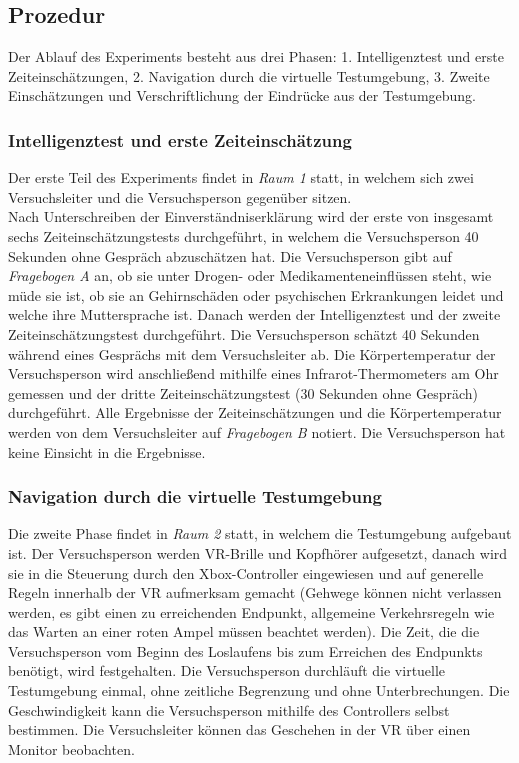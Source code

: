 \documentclass{Paper}
\begin{document}
\subsection{Prozedur}

Der Ablauf des Experiments besteht aus drei Phasen: 1. Intelligenztest und erste Zeiteinschätzungen, 2. Navigation durch die virtuelle Testumgebung, 3. Zweite Einschätzungen und Verschriftlichung der Eindrücke aus der Testumgebung.

\subsubsection{Intelligenztest und erste Zeiteinschätzung}
Der erste Teil des Experiments findet in \textit{Raum 1} statt, in welchem sich zwei Versuchsleiter und die Versuchsperson gegenüber sitzen.\\
Nach Unterschreiben der Einverständniserklärung wird der erste von insgesamt sechs Zeiteinschätzungstests durchgeführt, in welchem die Versuchsperson 40 Sekunden ohne Gespräch abzuschätzen hat. Die Versuchsperson gibt auf \textit{Fragebogen A} an, ob sie unter Drogen- oder Medikamenteneinflüssen steht, wie müde sie ist, ob sie an Gehirnschäden oder psychischen Erkrankungen leidet und welche ihre Muttersprache ist.
Danach werden der Intelligenztest und der zweite Zeiteinschätzungstest durchgeführt. Die Versuchsperson schätzt 40 Sekunden während eines Gesprächs mit dem Versuchsleiter ab. Die Körpertemperatur der Versuchsperson wird anschließend mithilfe eines Infrarot-Thermometers am Ohr gemessen und der dritte Zeiteinschätzungstest (30 Sekunden ohne Gespräch) durchgeführt.
Alle Ergebnisse der Zeiteinschätzungen und die
Körpertemperatur werden von dem Versuchsleiter auf \textit{Fragebogen B}
notiert. Die Versuchsperson hat keine Einsicht in die Ergebnisse.

\subsubsection{Navigation durch die virtuelle Testumgebung}
Die zweite Phase findet in \textit{Raum 2} statt, in welchem die Testumgebung aufgebaut ist. Der Versuchsperson werden VR-Brille und Kopfhörer aufgesetzt, danach wird sie in die Steuerung durch den Xbox-Controller eingewiesen und auf generelle Regeln innerhalb der VR aufmerksam gemacht (Gehwege können nicht verlassen werden, es gibt einen zu erreichenden Endpunkt, allgemeine Verkehrsregeln wie das Warten an einer roten Ampel müssen beachtet werden). 
Die Zeit, die die Versuchsperson vom Beginn des Loslaufens bis zum Erreichen des Endpunkts benötigt, wird festgehalten.
Die Versuchsperson durchläuft die virtuelle Testumgebung einmal, ohne zeitliche Begrenzung und ohne Unterbrechungen. Die Geschwindigkeit kann die Versuchsperson mithilfe des Controllers selbst bestimmen. Die Versuchsleiter können das Geschehen in der VR über einen Monitor beobachten.
\end{document}
